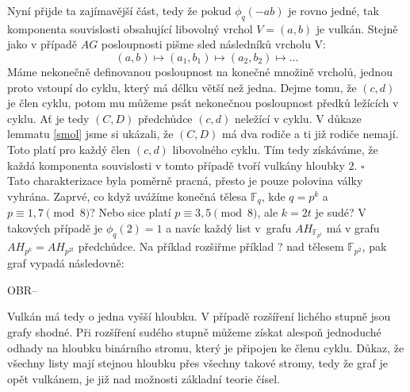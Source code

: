 \documentclass[12pt]{report}
\begin{document}


Nyní přijde ta zajímavější část, tedy že pokud $\phi_q(-ab)$ je rovno jedné, tak komponenta souvislosti obsahující libovolný vrchol $V=(a,b)$ je vulkán. Stejně jako v případě $AG$ posloupnosti pišme sled následníků vrcholu V:
$$(a,b)\longmapsto (a_1,b_1)\longmapsto (a_2, b_2) \longmapsto \dots$$
Máme nekonečně definovanou posloupnost na konečné množině vrcholů, jednou proto vstoupí do cyklu, který má délku větší než jedna. Dejme tomu, že $(c,d)$ je člen cyklu, potom mu můžeme psát nekonečnou posloupnost předků ležících v cyklu. Ať je tedy $(C,D)$ předchůdce $(c,d)$ neležící v cyklu.  V důkaze lemmatu \ref{smol} jsme si ukázali, že $(C,D)$ má dva rodiče a ti již rodiče nemají. Toto platí pro každý člen $(c,d)$ libovolného cyklu. Tím tedy získáváme, že každá komponenta souvislosti v tomto případě tvoří vulkány hloubky $2$. \hfill $\square$\\
 

Tato charakterizace byla poměrně pracná, přesto je pouze polovina války vyhrána. Zaprvé, co když uvážíme konečná tělesa $\mathbb{F}_q$, kde $q = p^k$ a $p \equiv 1,7 \pmod{8}$? Nebo sice platí $p \equiv 3,5 \pmod{8}$, ale $k = 2t$ je sudé? V takových případě je $\phi_q(2)=1$ a navíc každý list v~grafu $AH_{\mathbb{F}_{p^t}}$ má v grafu $AH_{p^k} = AH_{p^{2t}}$ předchůdce. Na příklad rozšiřme příklad ? nad tělesem $\mathbb{F}_{p^2}$, pak graf vypadá následovně:

OBR--

Vulkán má tedy o jedna vyšší hloubku. V případě rozšíření lichého stupně jsou grafy shodné. Při rozšíření sudého stupně můžeme získat alespoň jednoduché odhady na hloubku binárního stromu, který je připojen ke členu cyklu. Důkaz, že všechny listy mají stejnou hloubku přes všechny takové stromy, tedy že graf je opět vulkánem, je již nad možnosti základní teorie čísel. 
\end{document}
